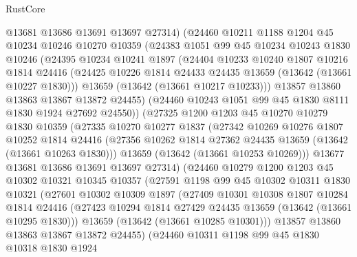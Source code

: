 \begin{lexlean}{RustCore}
\begin{coremodule}
        @13681
        @13686
        @13691
        @13697
        @27314)
      (@24460
        @10211
        @1188
        @1204
        @45
        @10234
        @10246
        @10270
        @10359
        (@24383
          @1051
          @99
          @45
          @10234
          @10243
          @1830
          @10246
          (@24395
            @10234
            @10241
            @1897
            (@24404
              @10233
              @10240
              @1807
              @10216
              @1814
              @24416
              (@24425 @10226 @1814 @24433 @24435 @13659 (@13642 (@13661 @10227 @1830)))
              @13659
              (@13642 (@13661 @10217 @10233)))
            @13857
            @13860
            @13863
            @13867
            @13872
            @24455)
          (@24460 @10243 @1051 @99 @45 @1830 @8111 @1830 @1924 @27692 @24550))
        (@27325
          @1200
          @1203
          @45
          @10270
          @10279
          @1830
          @10359
          (@27335
            @10270
            @10277
            @1837
            (@27342
              @10269
              @10276
              @1807
              @10252
              @1814
              @24416
              (@27356 @10262 @1814 @27362 @24435 @13659 (@13642 (@13661 @10263 @1830)))
              @13659
              (@13642 (@13661 @10253 @10269)))
            @13677
            @13681
            @13686
            @13691
            @13697
            @27314)
          (@24460
            @10279
            @1200
            @1203
            @45
            @10302
            @10321
            @10345
            @10357
            (@27591
              @1198
              @99
              @45
              @10302
              @10311
              @1830
              @10321
              (@27601
                @10302
                @10309
                @1897
                (@27409
                  @10301
                  @10308
                  @1807
                  @10284
                  @1814
                  @24416
                  (@27423 @10294 @1814 @27429 @24435 @13659 (@13642 (@13661 @10295 @1830)))
                  @13659
                  (@13642 (@13661 @10285 @10301)))
                @13857
                @13860
                @13863
                @13867
                @13872
                @24455)
              (@24460
                @10311
                @1198
                @99
                @45
                @1830
                @10318
                @1830
                @1924

\end{coremodule}
\end{lexlean}

